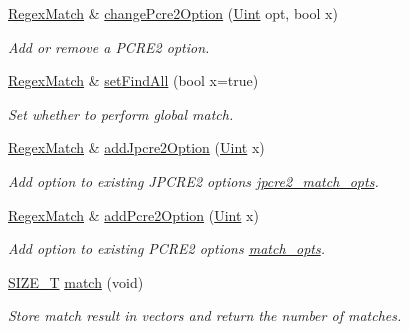 \begin{DoxyCompactItemize}
\hyperlink{classjpcre2_1_1RegexMatch}{Regex\+Match} \& \hyperlink{classjpcre2_1_1RegexMatch_a6893abc21b24a9d9fca146a33c0f823c}{change\+Pcre2\+Option} (\hyperlink{namespacejpcre2_a078242d38221a13fb3543b9edd78c099}{Uint} opt, bool x)
\begin{DoxyCompactList}\small\item\em Add or remove a P\+C\+R\+E2 option. \end{DoxyCompactList}\item 
\hyperlink{classjpcre2_1_1RegexMatch}{Regex\+Match} \& \hyperlink{classjpcre2_1_1RegexMatch_a85bdec86583f800dafcb1aae27f855e7}{set\+Find\+All} (bool x=true)
\begin{DoxyCompactList}\small\item\em Set whether to perform global match. \end{DoxyCompactList}\item 
\hyperlink{classjpcre2_1_1RegexMatch}{Regex\+Match} \& \hyperlink{classjpcre2_1_1RegexMatch_a0a4cf8554a7e00f3cf2db34f60a43f60}{add\+Jpcre2\+Option} (\hyperlink{namespacejpcre2_a078242d38221a13fb3543b9edd78c099}{Uint} x)
\begin{DoxyCompactList}\small\item\em Add option to existing J\+P\+C\+R\+E2 options \hyperlink{classjpcre2_1_1RegexMatch_a70d62df887eeed237724f64fbc378700}{jpcre2\+\_\+match\+\_\+opts}. \end{DoxyCompactList}\item 
\hyperlink{classjpcre2_1_1RegexMatch}{Regex\+Match} \& \hyperlink{classjpcre2_1_1RegexMatch_aac4857cd8f5eae15b29b9afbe9023522}{add\+Pcre2\+Option} (\hyperlink{namespacejpcre2_a078242d38221a13fb3543b9edd78c099}{Uint} x)
\begin{DoxyCompactList}\small\item\em Add option to existing P\+C\+R\+E2 options \hyperlink{classjpcre2_1_1RegexMatch_a697d5731007350b0f20d2018fcfafa90}{match\+\_\+opts}. \end{DoxyCompactList}\item 
\hyperlink{namespacejpcre2_a2aac465ddcb123560c7c8215dd69246c}{S\+I\+Z\+E\+\_\+T} \hyperlink{classjpcre2_1_1RegexMatch_a5868aef3a146594ea1ebef34d122bb33}{match} (void)
\begin{DoxyCompactList}\small\item\em Store match result in vectors and return the number of matches. \end{DoxyCompactList}\end{DoxyCompactItemize}
